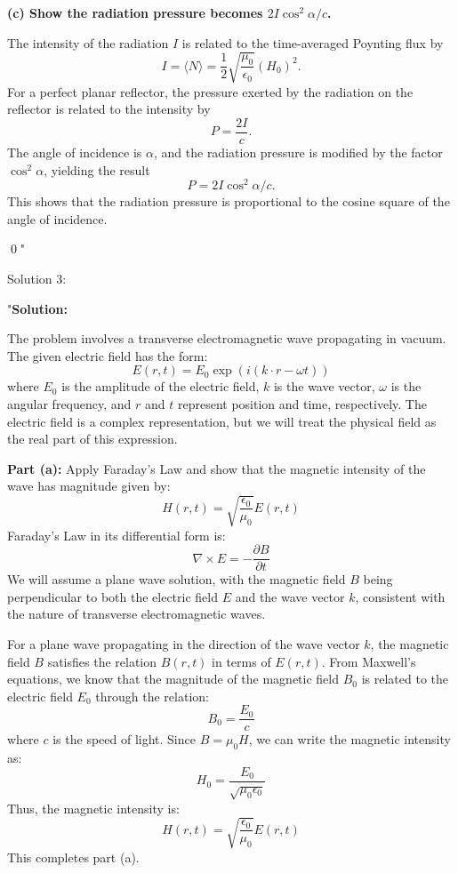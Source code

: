 \textbf{(c) Show the radiation pressure becomes \(2I \cos^2 \alpha / c\).}

The intensity of the radiation \(I\) is related to the time-averaged Poynting flux by
\[
I = \langle N \rangle = \frac{1}{2} \sqrt{\frac{\mu_0}{\epsilon_0}} (H_0)^2.
\]
For a perfect planar reflector, the pressure exerted by the radiation on the reflector is related to the intensity by
\[
P = \frac{2I}{c}.
\]
The angle of incidence is \(\alpha\), and the radiation pressure is modified by the factor \(\cos^2 \alpha\), yielding the result
\[
P = 2I \cos^2 \alpha / c.
\]
This shows that the radiation pressure is proportional to the cosine square of the angle of incidence.

\qed"

Solution 3: 

"\textbf{Solution:}

The problem involves a transverse electromagnetic wave propagating in vacuum. The given electric field has the form:
\[
E(r, t) = E_0 \exp(i (k \cdot r - \omega t))
\]
where \( E_0 \) is the amplitude of the electric field, \( k \) is the wave vector, \( \omega \) is the angular frequency, and \( r \) and \( t \) represent position and time, respectively. The electric field is a complex representation, but we will treat the physical field as the real part of this expression.

\textbf{Part (a):} Apply Faraday's Law and show that the magnetic intensity of the wave has magnitude given by:
\[
H(r, t) = \sqrt{\frac{\epsilon_0}{\mu_0}} E(r, t)
\]
Faraday's Law in its differential form is:
\[
\nabla \times E = - \frac{\partial B}{\partial t}
\]
We will assume a plane wave solution, with the magnetic field \( B \) being perpendicular to both the electric field \( E \) and the wave vector \( k \), consistent with the nature of transverse electromagnetic waves.

For a plane wave propagating in the direction of the wave vector \( k \), the magnetic field \( B \) satisfies the relation \( B(r, t) \) in terms of \( E(r, t) \). From Maxwell's equations, we know that the magnitude of the magnetic field \( B_0 \) is related to the electric field \( E_0 \) through the relation:
\[
B_0 = \frac{E_0}{c}
\]
where \( c \) is the speed of light. Since \( B = \mu_0 H \), we can write the magnetic intensity as:
\[
H_0 = \frac{E_0}{\sqrt{\mu_0 \epsilon_0}}
\]
Thus, the magnetic intensity is:
\[
H(r, t) = \sqrt{\frac{\epsilon_0}{\mu_0}} E(r, t)
\]
This completes part (a).

